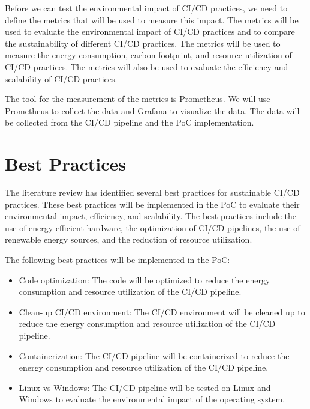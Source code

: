 Before we can test the environmental impact of CI/CD practices, we need to define the metrics that will be used to measure this impact. The metrics will be used to evaluate the environmental impact of CI/CD practices and to compare the sustainability of different CI/CD practices. The metrics will be used to measure the energy consumption, carbon footprint, and resource utilization of CI/CD practices. The metrics will also be used to evaluate the efficiency and scalability of CI/CD practices.

The tool for the measurement of the metrics is Prometheus. We will use Prometheus to collect the data and Grafana to visualize the data. The data will be collected from the CI/CD pipeline and the PoC implementation. 

\section{Best Practices}%
\label{sec:best-practices}

The literature review has identified several best practices for sustainable CI/CD practices. These best practices will be implemented in the PoC to evaluate their environmental impact, efficiency, and scalability. The best practices include the use of energy-efficient hardware, the optimization of CI/CD pipelines, the use of renewable energy sources, and the reduction of resource utilization.

The following best practices will be implemented in the PoC:
\begin{itemize}
    \item Code optimization: The code will be optimized to reduce the energy consumption and resource utilization of the CI/CD pipeline.
    \item Clean-up CI/CD environment: The CI/CD environment will be cleaned up to reduce the energy consumption and resource utilization of the CI/CD pipeline.
    \item Containerization: The CI/CD pipeline will be containerized to reduce the energy consumption and resource utilization of the CI/CD pipeline.
    \item Linux vs Windows: The CI/CD pipeline will be tested on Linux and Windows to evaluate the environmental impact of the operating system.
\end{itemize}



